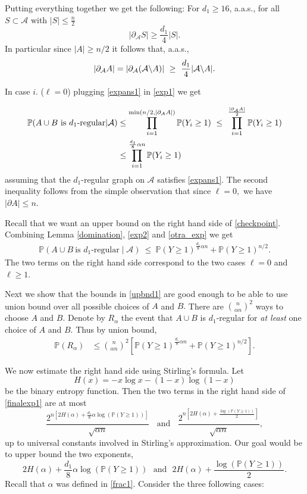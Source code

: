 \documentclass[11pt,reqno]{amsart}
\begin{document}
Putting everything together we get the following:
For $d_1\ge 16$, a.a.s., for all $S\subset \mathcal{A} $ with $|S|\le \frac{n}{2}$ $$|\partial_{\mathcal{A}} S|\ge \frac{d_1}{4}|S|.$$
In particular since $|A|\ge n/2$ it follows that, a.a.s.,
\begin{equation}\label{expans1}
|\partial_{\mathcal{A}} A|=|\partial_{\mathcal{A}} (\mathcal{A}\backslash A)|~\ge~ \frac{d_1}{4}|\mathcal{A}\backslash A|.
\end{equation}

In case $i.$ ($\ell=0$) plugging \eqref{expans1} in \eqref{exp1} we get

\begin{align}\label{otra_exp}
\mathbb{P}(A\cup B~\mbox{is $d_1$-regular}| \mathcal{A}) &\le \prod_{i=1}^{\min(n/2,|\partial_{\mathcal{A}} A|)}\mathbb{P}(Y_i\ge 1) ~\le~ \prod_{i=1}^{\frac{|\partial_{\mathcal{A}} A|}{2}}\mathbb{P}(Y_i\ge 1)\\
\nonumber 
&\le \prod_{i=1}^{\frac{d_1}{8}\alpha n}\mathbb{P}(Y_i\ge 1)
\end{align}
assuming that the $d_1$-regular graph on $\mathcal{A}$ satisfies \eqref{expans1}. The second inequality follows from the simple observation that since $\ell=0,$  we have $|\partial A| \le n.$

Recall that we want an upper bound on the right hand side of \ref{checkpoint}. Combining Lemma \ref{domination}, \eqref{exp2} and \eqref{otra_exp} we get
\begin{align}\label{upbnd1}
\mathbb{P}(A\cup B~\mbox{is $d_1$-regular}\mid \mathcal{A})~\leq~  \mathbb{P}(Y\ge 1)^{\frac{d_1}{8}\alpha n}+\mathbb{P}(Y\ge 1)^{n/2}.
\end{align}
The two terms on the right hand side correspond to the two cases $\ell=0 $ and $\ell \ge 1$.

Next we show that the bounds in \eqref{upbnd1} are good enough to be able to use union bound over all possible choices of $A$ and $B.$ 
There are  $\binom{n}{\alpha n}^2$ ways to choose $A$ and $B$. Denote
by $R_{\alpha}$ the event that $A\cup B$ is $d_1$-regular for \textit{at least} one choice of $A$ and $B$. Thus by union bound,
\begin{align}\label{finalexp1}
\mathbb{P}(R_{\alpha})& \leq \binom{n}{\alpha n}^2\left[\mathbb{P}(Y\ge 1)^{\frac{d_1}{8}\alpha n}+\mathbb{P}(Y\ge 1)^{n/2}\right].
\end{align}

We now estimate the right hand side using Stirling's formula. 
Let $$H(x)=-x\log x-(1-x)\log(1-x)$$ be the binary entropy function. 
Then the two terms in the right hand side of \eqref{finalexp1}
are at most
$$\frac{2^{n[2H(\alpha)+\frac{d_1}{8}\alpha\log(\mathbb{P}(Y\ge 1))]}}{\sqrt{\alpha n}} \ \ \ \ \text{and} \ \ \ \ \frac{2^{n[2H(\alpha)+\frac{\log(\mathbb{P}(Y\ge 1))}{2}]}}{\sqrt{\alpha n}},$$
up to universal constants involved in Stirling's approximation. Our goal would be to upper bound the two exponents,
\begin{equation}\label{twocase1}
2H(\alpha)+\frac{d_1}{8}\alpha\log(\mathbb{P}(Y\ge 1))~~~\mbox{and}~~~2H(\alpha)+\frac{\log(\mathbb{P}(Y\ge 1))}{2}.
\end{equation}
Recall that $\alpha$ was defined in \eqref{frac1}.
Consider the three following cases:
\end{document}
